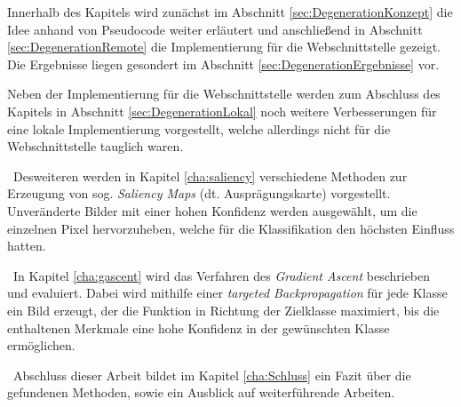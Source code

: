 Innerhalb des Kapitels wird zunächst im Abschnitt \ref{sec:DegenerationKonzept} die Idee anhand von Pseudocode weiter erläutert und anschließend in Abschnitt  \ref{sec:DegenerationRemote} die Implementierung für die Webschnittstelle gezeigt. Die Ergebnisse liegen gesondert im Abschnitt \ref{sec:DegenerationErgebnisse} vor. 

Neben der Implementierung für die Webschnittstelle werden zum Abschluss des Kapitels in Abschnitt \ref{sec:DegenerationLokal} noch weitere Verbesserungen für eine lokale Implementierung vorgestellt, welche allerdings nicht für die Webschnittstelle tauglich waren.


~\newline Desweiteren werden in Kapitel \ref{cha:saliency} verschiedene Methoden zur Erzeugung von sog. \textit{Saliency Maps} (dt. Ausprägungskarte) vorgestellt. Unveränderte Bilder mit einer hohen Konfidenz werden ausgewählt, um die einzelnen Pixel hervorzuheben, welche für die Klassifikation den höchsten Einfluss hatten.

~\newline In Kapitel \ref{cha:gascent} wird das Verfahren des \textit{Gradient Ascent} beschrieben und evaluiert. Dabei wird mithilfe einer \textit{targeted Backpropagation} für jede Klasse ein Bild erzeugt, der die Funktion in Richtung der Zielklasse maximiert, bis die enthaltenen Merkmale eine hohe Konfidenz in der gewünschten Klasse ermöglichen.

~\newline Abschluss dieser Arbeit bildet im Kapitel \ref{cha:Schluss} ein Fazit über die gefundenen Methoden, sowie ein Ausblick auf weiterführende Arbeiten. 
